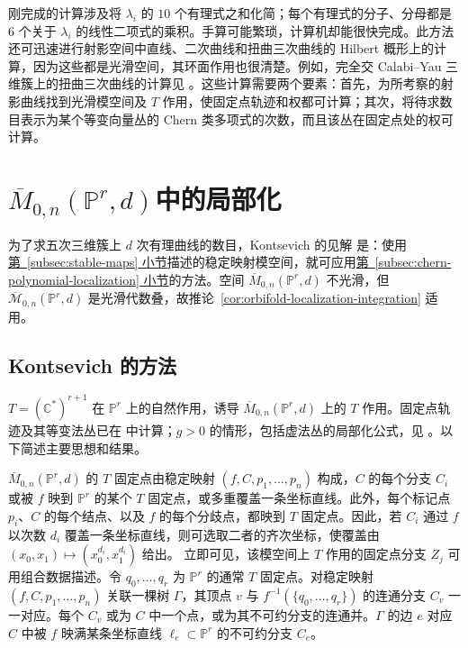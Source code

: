 刚完成的计算涉及将 $\lambda_i$ 的 $10$ 个有理式之和化简；每个有理式的分子、分母都是 $6$ 个关于 $\lambda_i$ 的线性二项式的乘积。手算可能繁琐，计算机却能很快完成。此方法还可迅速进行射影空间中直线、二次曲线和扭曲三次曲线的 Hilbert 概形上的计算，因为这些都是光滑空间，其环面作用也很清楚。例如，完全交 Calabi--Yau 三维簇上的扭曲三次曲线的计算见 。这些计算需要两个要素：首先，为所考察的射影曲线找到光滑模空间及 $T$ 作用，使固定点轨迹和权都可计算；其次，将待求数目表示为某个等变向量丛的 Chern 类多项式的次数，而且该丛在固定点处的权可计算。

\section{\texorpdfstring{$\overline M_{0,n}(\mathbb P^r,d)$}{稳定映射模空间}中的局部化}\label{sec:stable-map-localization}
为了求五次三维簇上 $d$ 次有理曲线的数目，Kontsevich 的见解  是：使用\hyperref[subsec:stable-maps]{第~\ref*{subsec:stable-maps} 小节}描述的稳定映射模空间，就可应用\hyperref[subsec:chern-polynomial-localization]{第~\ref*{subsec:chern-polynomial-localization} 小节}的方法。空间 $\overline M_{0,n}(\mathbb P^r,d)$ 不光滑，但 $\overline{\mathcal M}_{0,n}(\mathbb P^r,d)$ 是光滑代数叠，故推论~\ref{cor:orbifold-localization-integration} 适用。

\subsection{Kontsevich 的方法}\label{subsec:kontsevich-localization}
$T=(\mathbb C^*)^{r+1}$ 在 $\mathbb P^r$ 上的自然作用，诱导 $\overline M_{0,n}(\mathbb P^r,d)$ 上的 $T$ 作用。固定点轨迹及其等变法丛已在  中计算；$g>0$ 的情形，包括虚法丛的局部化公式，见 。以下简述主要思想和结果。

$\overline M_{0,n}(\mathbb P^r,d)$ 的 $T$ 固定点由稳定映射 $(f,C,p_1,\ldots,p_n)$ 构成，$C$ 的每个分支 $C_i$ 或被 $f$ 映到 $\mathbb P^r$ 的某个 $T$ 固定点，或多重覆盖一条坐标直线。此外，每个标记点 $p_i$、$C$ 的每个结点、以及 $f$ 的每个分歧点，都映到 $T$ 固定点。因此，若 $C_i$ 通过 $f$ 以次数 $d_i$ 覆盖一条坐标直线，则可选取二者的齐次坐标，使覆盖由 $(x_0,x_1)\mapsto(x_0^{d_i},x_1^{d_i})$ 给出。
立即可见，该模空间上 $T$ 作用的固定点分支 $Z_j$ 可用组合数据描述。令 $q_0,\ldots,q_r$ 为 $\mathbb P^r$ 的通常 $T$ 固定点。对稳定映射 $(f,C,p_1,\ldots,p_n)$ 关联一棵树 $\Gamma$，其顶点 $v$ 与 $f^{-1}(\{q_0,\ldots,q_r\})$ 的连通分支 $C_v$ 一一对应。每个 $C_v$ 或为 $C$ 中一个点，或为其不可约分支的连通并。$\Gamma$ 的边 $e$ 对应 $C$ 中被 $f$ 映满某条坐标直线 $\ell_e\subset\mathbb P^r$ 的不可约分支 $C_e$。

